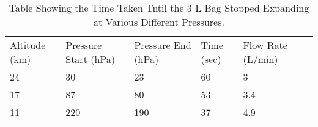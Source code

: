 \begin{table}[H]
\centering

\begin{tabular}{|l|l|l|l|l|l}
\cline{1-5}
Altitude (km) & Pressure Start (hPa) & Pressure End (hPa) & Time (sec) & Flow Rate (L/min) &  \\ \cline{1-5}
24 & 30 & 23 & 60 & 3 &  \\ \cline{1-5}
17 & 87 & 80 & 53 & 3.4 &  \\ \cline{1-5}
11 & 220 & 190 & 37 & 4.9 &  \\ \cline{1-5}
\end{tabular}
\caption{Table Showing the Time Taken Tntil the 3 L Bag Stopped Expanding at Various Different Pressures.}
\label{tab:holding-times-condensation}
\end{table}

\raggedbottom